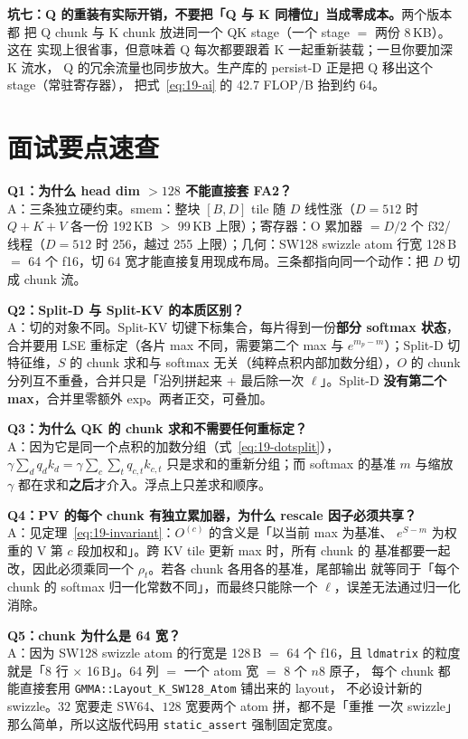 \textbf{坑七：Q 的重装有实际开销，不要把「Q 与 K 同槽位」当成零成本。}两个版本都
把 Q chunk 与 K chunk 放进同一个 QK stage（一个 stage $=$ 两份 8\,KB）。这在
实现上很省事，但意味着 Q 每次都要跟着 K 一起重新装载；一旦你要加深 K 流水，
Q 的冗余流量也同步放大。生产库的 persist-D 正是把 Q 移出这个 stage（常驻寄存器），
把式~\ref{eq:19-ai} 的 42.7 FLOP/B 抬到约 64。

\section{面试要点速查}

\textbf{Q1：为什么 head dim $> 128$ 不能直接套 FA2？}\\
A：三条独立硬约束。smem：整块 $[B,D]$ tile 随 $D$ 线性涨（$D{=}512$ 时
$Q{+}K{+}V$ 各一份 192\,KB $>$ 99\,KB 上限）；寄存器：O 累加器 $= D/2$ 个
f32/线程（$D{=}512$ 时 256，越过 255 上限）；几何：SW128 swizzle atom 行宽
128\,B $=$ 64 个 f16，切 64 宽才能直接复用现成布局。三条都指向同一个动作：把 $D$ 切成 chunk 流。

\textbf{Q2：Split-D 与 Split-KV 的本质区别？}\\
A：切的对象不同。Split-KV 切键下标集合，每片得到一份\textbf{部分 softmax 状态}，
合并要用 LSE 重标定（各片 max 不同，需要第二个 max 与 $e^{m_p-m}$）；Split-D
切特征维，$S$ 的 chunk 求和与 softmax 无关（纯粹点积内部加数分组），$O$ 的
chunk 分列互不重叠，合并只是「沿列拼起来 + 最后除一次 $\ell$」。Split-D
\textbf{没有第二个 max}，合并里零额外 exp。两者正交，可叠加。

\textbf{Q3：为什么 QK 的 chunk 求和不需要任何重标定？}\\
A：因为它是同一个点积的加数分组（式~\ref{eq:19-dotsplit}），$\gamma \sum_d q_d k_d
= \gamma \sum_c \sum_{t} q_{c,t} k_{c,t}$ 只是求和的重新分组；而 softmax 的基准
$m$ 与缩放 $\gamma$ 都在求和\textbf{之后}才介入。浮点上只差求和顺序。

\textbf{Q4：PV 的每个 chunk 有独立累加器，为什么 rescale 因子必须共享？}\\
A：见定理~\ref{eq:19-invariant}：$O^{(c)}$ 的含义是「以当前 max 为基准、
$e^{S-m}$ 为权重的 V 第 $c$ 段加权和」。跨 KV tile 更新 max 时，所有 chunk 的
基准都要一起改，因此必须乘同一个 $\rho_t$。若各 chunk 各用各的基准，尾部输出
就等同于「每个 chunk 的 softmax 归一化常数不同」，而最终只能除一个 $\ell$，误差无法通过归一化消除。

\textbf{Q5：chunk 为什么是 64 宽？}\\
A：因为 SW128 swizzle atom 的行宽是 128\,B $=$ 64 个 f16，且 \texttt{ldmatrix}
的粒度就是「8 行 $\times$ 16\,B」。64 列 $=$ 一个 atom 宽 $=$ 8 个 $n8$ 原子，
每个 chunk 都能直接套用 \texttt{GMMA::\allowbreak{}Layout\_\allowbreak{}K\_\allowbreak{}SW128\_\allowbreak{}Atom} 铺出来的 layout，
不必设计新的 swizzle。$32$ 宽要走 SW64、$128$ 宽要两个 atom 拼，都不是「重推
一次 swizzle」那么简单，所以这版代码用 \texttt{static\_\allowbreak{}assert} 强制固定宽度。

